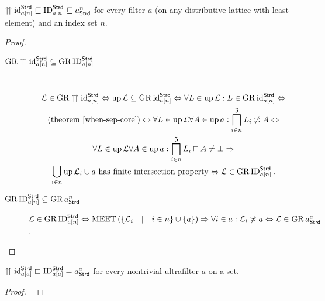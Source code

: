 \begin{prop}
$\upuparrows\operatorname{id}_{a[n]}^{\mathsf{Strd}}\sqsubseteq\operatorname{ID}_{a[n]}^{\mathsf{Strd}}\sqsubseteq a_{\mathsf{Strd}}^{n}$
for every filter $a$ (on any distributive lattice with least element) and an index set
$n$.\end{prop}
\begin{proof}
~
\begin{description}
\item [{$\operatorname{GR}\upuparrows\operatorname{id}_{a[n]}^{\mathsf{Strd}}\subseteq\operatorname{GR}\operatorname{ID}_{a[n]}^{\mathsf{Strd}}$}] ~
\begin{multline*}
\mathcal{L}\in\operatorname{GR}\upuparrows\operatorname{id}_{a[n]}^{\mathsf{Strd}}\Leftrightarrow\operatorname{up}\mathcal{L}\subseteq\operatorname{GR}\operatorname{id}_{a[n]}^{\mathsf{Strd}}\Leftrightarrow\forall L\in\operatorname{up}\mathcal{L}:L\in\operatorname{GR}\operatorname{id}_{a[n]}^{\mathsf{Strd}}\Leftrightarrow\\
\text{(theorem~\ref{when-sep-core})}\Leftrightarrow\forall L\in\operatorname{up}\mathcal{L}\forall A\in\operatorname{up} a:\bigsqcap_{i\in n}^{\mathfrak{Z}}L_{i}\not\asymp A\Leftrightarrow\\
\forall L\in\operatorname{up}\mathcal{L}\forall A\in\operatorname{up} a:\bigsqcap_{i\in n}^{\mathfrak{Z}}L_{i}\sqcap A\neq\bot\Rightarrow\\
\bigcup_{i\in n}\operatorname{up}\mathcal{L}_{i}\cup a\text{ has finite intersection property}\Leftrightarrow\mathcal{L}\in\operatorname{GR}\operatorname{ID}_{a[n]}^{\mathsf{Strd}}.
\end{multline*}

\item [{$\operatorname{GR}\operatorname{ID}_{a[n]}^{\mathsf{Strd}}\subseteq\operatorname{GR} a_{\mathsf{Strd}}^{n}$}] $\mathcal{L}\in\operatorname{GR}\operatorname{ID}_{a[n]}^{\mathsf{Strd}}\Leftrightarrow\operatorname{MEET}\left(\left\{ \mathcal{L}_{i}\hspace{1em}|\hspace{1em}i\in n\right\} \cup\{a\}\right)\Rightarrow\forall i\in a:\mathcal{L}_{i}\not\asymp a\Leftrightarrow\mathcal{L}\in\operatorname{GR} a_{\mathsf{Strd}}^{a}$.
\end{description}
\end{proof}
\begin{prop}
$\upuparrows\operatorname{id}_{a[a]}^{\mathsf{Strd}}\sqsubset\operatorname{ID}_{a[a]}^{\mathsf{Strd}}=a_{\mathsf{Strd}}^{a}$
for every nontrivial ultrafilter $a$ on a set.\end{prop}
\begin{proof}
~\end{proof}
